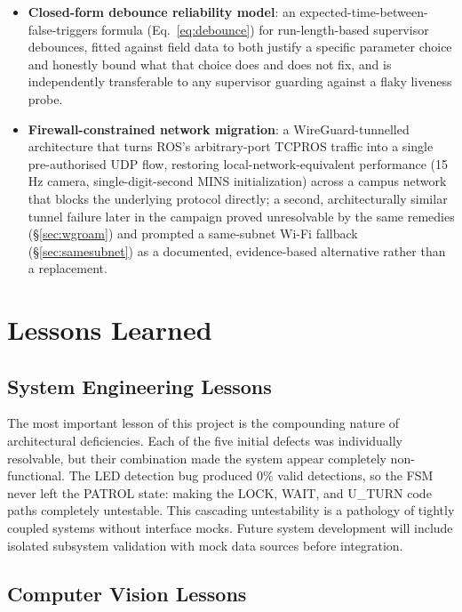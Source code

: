 \begin{itemize}[leftmargin=1.4em]
  \item \textbf{Closed-form debounce reliability model}: an expected-time-between-false-triggers formula (Eq.~\eqref{eq:debounce}) for run-length-based supervisor debounces, fitted against field data to both justify a specific parameter choice and honestly bound what that choice does and does not fix, and is independently transferable to any supervisor guarding against a flaky liveness probe.
  \item \textbf{Firewall-constrained network migration}: a WireGuard-tunnelled architecture that turns ROS's arbitrary-port TCPROS traffic into a single pre-authorised UDP flow, restoring local-network-equivalent performance (15\,Hz camera, single-digit-second MINS initialization) across a campus network that blocks the underlying protocol directly; a second, architecturally similar tunnel failure later in the campaign proved unresolvable by the same remedies (\S\ref{sec:wgroam}) and prompted a same-subnet Wi-Fi fallback (\S\ref{sec:samesubnet}) as a documented, evidence-based alternative rather than a replacement.
\end{itemize}

\section{Lessons Learned}

\subsection{System Engineering Lessons}

The most important lesson of this project is the compounding nature of architectural deficiencies. Each of the five initial defects was individually resolvable, but their combination made the system appear completely non-functional. The LED detection bug produced 0\% valid detections, so the FSM never left the PATROL state: making the LOCK, WAIT, and U\_TURN code paths completely untestable. This cascading untestability is a pathology of tightly coupled systems without interface mocks. Future system development will include isolated subsystem validation with mock data sources before integration.

\subsection{Computer Vision Lessons}

